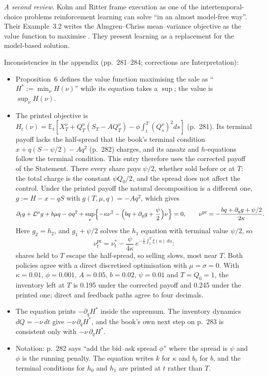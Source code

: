 \begin{qfmodel}
\emph{A second review}. Kolm and Ritter frame execution as one of the intertemporal-choice problems reinforcement learning can solve ``in an almost model-free way''. Their Example~3.2 writes the Almgren--Chriss mean--variance objective as the value function to maximise \citep[undated preprint, Internet Archive capture of 28 May 2024, abstract and Example~3.2, pp.~1 and~9]{wide-kolm-ritter-rl}. They present learning as a replacement for the model-based solution.

 Inconsistencies in the appendix (pp.~281--284; corrections are Interpretation):
\begin{itemize}
\item Proposition~6 defines the value function maximising the sale as ``$H^*:=\min_\nu H(\nu)$'' while its equation takes a $\sup$; the value is $\sup_\nu H(\nu)$.
\item The printed objective is $H_t(\nu)=\mathbb E_t[X_T^\nu+Q_T^\nu(S_T-AQ_T^\nu)-\phi\int_t^T(Q_s^\nu)^2ds]$ (p.~281). Its terminal payoff lacks the half-spread that the book's terminal condition $x+q(S-\psi/2)-Aq^2$ (p.~282) charges, and its ansatz and $h$-equations follow the terminal condition. This entry therefore uses the corrected payoff of the Statement. There every share pays $\psi/2$, whether sold before or at $T$: the total charge is the constant $\psi Q_0/2$, and the spread does not affect the control. Under the printed payoff the natural decomposition is a different one, $g:=H-x-qS$ with $g(T,\mu,q)=-Aq^2$, which gives
\[ \partial_tg+\mathcal L^\mu g+b\mu q-\phi q^2+\sup_\nu\Bigl\{-\kappa\nu^2-\Bigl(bq+\partial_qg+\frac\psi2\Bigr)\nu\Bigr\}=0,\qquad \nu^{\mathrm{pr}}=-\frac{bq+\partial_qg+\psi/2}{2\kappa}. \]
Here $g_2=h_2$, and $g_1+\psi/2$ solves the $h_1$ equation with terminal value $\psi/2$, so
\[ \nu^{\mathrm{pr}}_t=\nu^*_t-\frac{\psi}{4\kappa}\,e^{-\frac1\kappa\int_t^T\xi(u)\,du}: \]
shares held to $T$ escape the half-spread, so selling slows, most near $T$. Both policies agree with a direct discretised optimisation with $\mu=\sigma=0$. With $\kappa=0.01$, $\phi=0.001$, $A=0.05$, $b=0.02$, $\psi=0.01$ and $T=Q_0=1$, the inventory left at $T$ is 0.195 under the corrected payoff and 0.245 under the printed one; direct and feedback paths agree to four decimals.
\item The equation prints $-\partial_qH^*$ inside the supremum. The inventory dynamics $dQ=-\nu\,dt$ give $-\nu\,\partial_qH^*$, and the book's own next step on p.~283 is consistent only with $-\nu\,\partial_qH^*$.
\item Notation: p.~282 says ``add the bid--ask spread $\phi$'' where the spread is $\psi$ and $\phi$ is the running penalty. The equation writes $k$ for $\kappa$ and $b_t$ for $b$, and the terminal conditions for $h_0$ and $h_1$ are printed at $t$ rather than $T$.

\end{itemize}
\end{qfmodel}
